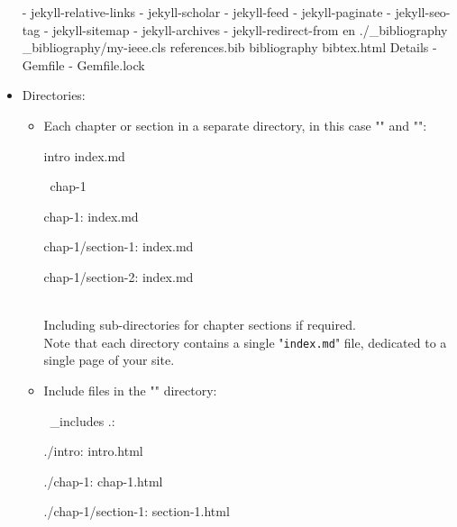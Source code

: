 \begin{itemize}
{{\begin{scriptii}
  - jekyll-relative-links
  - jekyll-scholar
  - jekyll-feed
  - jekyll-paginate
  - jekyll-seo-tag
  - jekyll-sitemap
  - jekyll-archives
  - jekyll-redirect-from
   en
   ./\_bibliography
   \_bibliography/my-ieee.cls
   references.bib
   
   
      
   
      bibliography
   bibtex.html
     Details
   
  - Gemfile
  - Gemfile.lock
\end{scriptii}
}}

\item Directories:
\begin{itemize}
\item Each chapter or section in a separate directory, in this case "" and "":
\vspace{-0.25cm}
{\footnotesize{
\begin{scriptii}
  intro
index.md

 \lsr\ chap-1

chap-1:
index.md    

chap-1/section-1:
index.md

chap-1/section-2:
index.md
\end{scriptii}
}}\\[-0.5cm]
\noindent Including sub-directories for chapter sections if required. \\
Note that each directory contains a single "\texttt{index.md}" file, dedicated to a single page of your site. \\[0.25cm]
\item Include files in the "" directory:
{\footnotesize{
\begin{scriptii}
 \lsr\ \_includes
.:
  

./intro:
intro.html

./chap-1:
chap-1.html    

./chap-1/section-1:
section-1.html


\end{scriptii}}}
\end{itemize}
\end{itemize}
